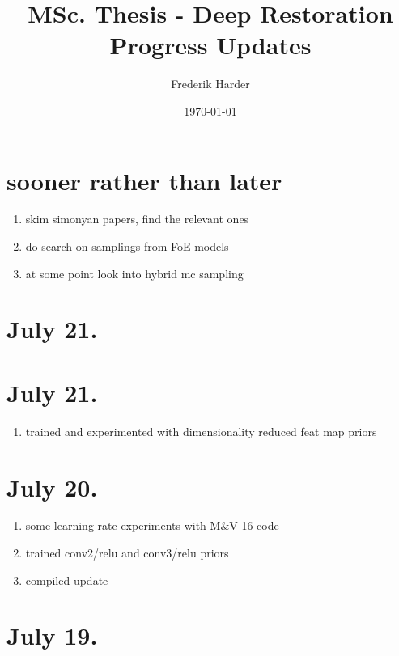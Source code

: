 \documentclass{article}
\title{MSc. Thesis - Deep Restoration\\Progress Updates}
\date{\today}
\author{Frederik Harder}
\begin{document}
\maketitle

\section*{sooner rather than later}

\begin{enumerate}
	\item skim simonyan papers, find the relevant ones
	\item do search on samplings from FoE models
	\item at some point look into hybrid mc sampling
\end{enumerate}

\section*{July 21.}

\begin{enumerate}
	
\end{enumerate}


\section*{July 21.}

\begin{enumerate}
	\item trained and experimented with dimensionality reduced feat map priors
\end{enumerate}


\section*{July 20.}

\begin{enumerate}
	\item some learning rate experiments with M\&V 16 code
	\item trained conv2/relu and conv3/relu priors
	\item compiled update
\end{enumerate}


\section*{July 19.}
\end{document}

